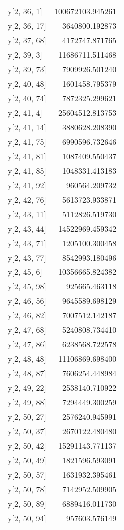\begin{longtable}{lr}
y[2, 36, 1] & 100672103.945261 \\
y[2, 36, 17] & 3640800.192873 \\
y[2, 37, 68] & 4172747.871765 \\
y[2, 39, 3] & 11686711.511468 \\
y[2, 39, 73] & 7909926.501240 \\
y[2, 40, 48] & 1601458.795379 \\
y[2, 40, 74] & 7872325.299621 \\
y[2, 41, 4] & 25604512.813753 \\
y[2, 41, 14] & 3880628.208390 \\
y[2, 41, 75] & 6990596.732646 \\
y[2, 41, 81] & 1087409.550437 \\
y[2, 41, 85] & 1048331.413183 \\
y[2, 41, 92] & 960564.209732 \\
y[2, 42, 76] & 5613723.933871 \\
y[2, 43, 11] & 5112826.519730 \\
y[2, 43, 44] & 14522969.459342 \\
y[2, 43, 71] & 1205100.300458 \\
y[2, 43, 77] & 8542993.180496 \\
y[2, 45, 6] & 10356665.824382 \\
y[2, 45, 98] & 925665.463118 \\
y[2, 46, 56] & 9645589.698129 \\
y[2, 46, 82] & 7007512.142187 \\
y[2, 47, 68] & 5240808.734410 \\
y[2, 47, 86] & 6238568.722578 \\
y[2, 48, 48] & 11106869.698400 \\
y[2, 48, 87] & 7606254.448984 \\
y[2, 49, 22] & 2538140.710922 \\
y[2, 49, 88] & 7294449.300259 \\
y[2, 50, 27] & 2576240.945991 \\
y[2, 50, 37] & 2670122.480480 \\
y[2, 50, 42] & 15291143.771137 \\
y[2, 50, 49] & 1821596.593091 \\
y[2, 50, 57] & 1631932.395461 \\
y[2, 50, 78] & 7142952.509905 \\
y[2, 50, 89] & 6889416.011730 \\
y[2, 50, 94] & 957603.576149 \\

\end{longtable}
